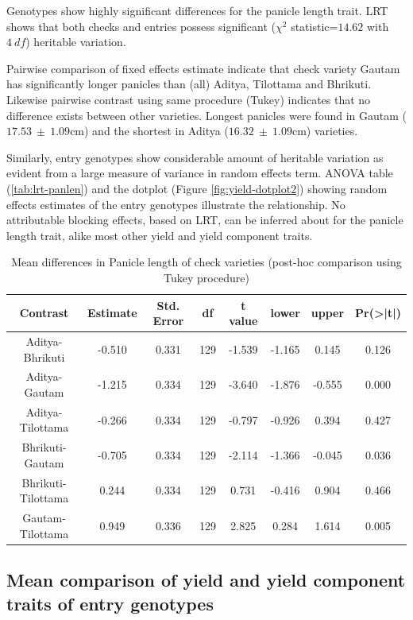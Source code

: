 \documentclass[12pt,oneside]{dukestatscithesis} %
\begin{document}
Genotypes show highly significant differences for the panicle length trait. LRT shows that both checks and entries possess significant (\(\chi^2\) statistic=\(14.62\) with \(4\ df\)) heritable variation.

Pairwise comparison of fixed effects estimate indicate that check variety Gautam has significantly longer panicles than (all) Aditya, Tilottama and Bhrikuti. Likewise pairwise contrast using same procedure (Tukey) indicates that no difference exists between other varieties. Longest panicles were found in Gautam (\(17.53\ \pm\ 1.09\)cm) and the shortest in Aditya (\(16.32\ \pm\ 1.09\)cm) varieties.

Similarly, entry genotypes show considerable amount of heritable variation as evident from a large measure of variance in random effects term. ANOVA table (\ref{tab:lrt-panlen}) and the dotplot (Figure \ref{fig:yield-dotplot2}) showing random effects estimates of the entry genotypes illustrate the relationship. No attributable blocking effects, based on LRT, can be inferred about for the panicle length trait, alike most other yield and yield component traits.
\begin{table}[H]

\caption{\label{tab:yield-meanconf-tab5}Mean differences in Panicle length of check varieties (post-hoc comparison using Tukey procedure)}
\centering
\begin{tabular}[t]{cccccccc}
\toprule
Contrast & Estimate & Std. Error & df & t value & lower & upper & Pr(>|t|)\\
\midrule
Aditya-Bhrikuti & -0.510 & 0.331 & 129 & -1.539 & -1.165 & 0.145 & 0.126\\
Aditya-Gautam & -1.215 & 0.334 & 129 & -3.640 & -1.876 & -0.555 & 0.000\\
Aditya-Tilottama & -0.266 & 0.334 & 129 & -0.797 & -0.926 & 0.394 & 0.427\\
Bhrikuti-Gautam & -0.705 & 0.334 & 129 & -2.114 & -1.366 & -0.045 & 0.036\\
Bhrikuti-Tilottama & 0.244 & 0.334 & 129 & 0.731 & -0.416 & 0.904 & 0.466\\
Gautam-Tilottama & 0.949 & 0.336 & 129 & 2.825 & 0.284 & 1.614 & 0.005\\
\bottomrule
\end{tabular}
\end{table}
\hypertarget{mean-comparison-of-yield-and-yield-component-traits-of-entry-genotypes}{%
\subsection{Mean comparison of yield and yield component traits of entry genotypes}\label{mean-comparison-of-yield-and-yield-component-traits-of-entry-genotypes}}
\end{document}
